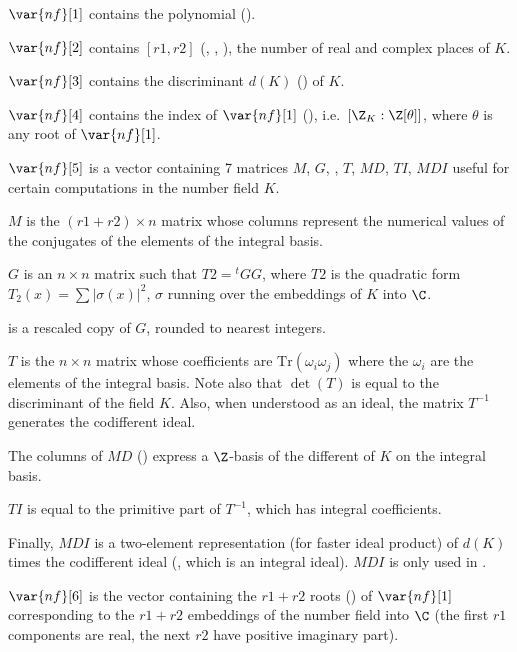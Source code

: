 $\var{nf}[1]$ contains the polynomial  ().

$\var{nf}[2]$ contains $[r1,r2]$ (, ,
), the number of real and complex places of $K$.

$\var{nf}[3]$ contains the discriminant $d(K)$ () of $K$.

$\var{nf}[4]$ contains the index of $\var{nf}[1]$ (),
i.e.~$[\Z_K : \Z[\theta]]$, where $\theta$ is any root of $\var{nf}[1]$.

$\var{nf}[5]$ is a vector containing 7 matrices $M$, $G$, , $T$,
$MD$, $TI$, $MDI$ useful for certain computations in the number field $K$.

\quad\item $M$ is the $(r1+r2)\times n$ matrix whose columns represent
the numerical values of the conjugates of the elements of the integral
basis.

\quad\item $G$ is an $n\times n$ matrix such that $T2 = {}^t G G$,
where $T2$ is the quadratic form $T_2(x) = \sum |\sigma(x)|^2$, $\sigma$
running over the embeddings of $K$ into $\C$.

\quad\item {} is a rescaled copy of $G$, rounded to nearest
integers.

\quad\item $T$ is the $n\times n$ matrix whose coefficients are
$\text{Tr}(\omega_i\omega_j)$ where the $\omega_i$ are the elements of the
integral basis. Note also that $\det(T)$ is equal to the discriminant of the
field $K$. Also, when understood as an ideal, the matrix $T^{-1}$
generates the codifferent ideal.

\quad\item The columns of $MD$ () express a $\Z$-basis
of the different of $K$ on the integral basis.

\quad\item $TI$ is equal to the primitive part of $T^{-1}$, which has integral
coefficients.

\quad\item Finally, $MDI$ is a two-element representation (for faster
ideal product) of $d(K)$ times the codifferent ideal
(, which is an integral ideal). $MDI$
is only used in .

$\var{nf}[6]$ is the vector containing the $r1+r2$ roots
() of $\var{nf}[1]$ corresponding to the $r1+r2$
embeddings of the number field into $\C$ (the first $r1$ components are real,
the next $r2$ have positive imaginary part).

